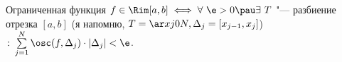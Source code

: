 
 	Ограниченная функция $f\in\Rim[a,b]\iff\forall\ \e>0\pau\exists\  T$ "--- разбиение отрезка $[a,b]$
 	(я напомню, $T=\ar xj0N,\Delta_j=[x_{j-1},x_j]$)$\colon\sum\limits_{j=1}^N\osc(f,\Delta_j)\cdot|\Delta_j|<\e$.
 